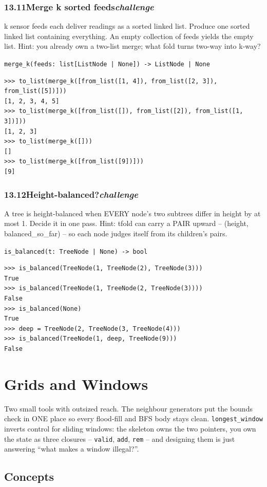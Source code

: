 \documentclass[10pt,letterpaper]{book}
\begin{document}
\subsection*{13.11\quad Merge k sorted feeds\hfill\textnormal{\textit{challenge}}}
k sensor feeds each deliver readings as a sorted linked list. Produce one sorted linked list containing everything. An empty collection of feeds yields the empty list. Hint: you already own a two-list merge; what fold turns two-way into k-way?

\noindent\texttt{merge\_k(feeds: list[ListNode | None]) -> ListNode | None}
\begin{lstlisting}[style=ex]
>>> to_list(merge_k([from_list([1, 4]), from_list([2, 3]), from_list([5])]))
[1, 2, 3, 4, 5]
>>> to_list(merge_k([from_list([]), from_list([2]), from_list([1, 3])]))
[1, 2, 3]
>>> to_list(merge_k([]))
[]
>>> to_list(merge_k([from_list([9])]))
[9]
\end{lstlisting}
\subsection*{13.12\quad Height-balanced?\hfill\textnormal{\textit{challenge}}}
A tree is height-balanced when EVERY node's two subtrees differ in height by at most 1. Decide it in one pass. Hint: tfold can carry a PAIR upward -- (height, balanced\_so\_far) -- so each node judges itself from its children's pairs.

\noindent\texttt{is\_balanced(t: TreeNode | None) -> bool}
\begin{lstlisting}[style=ex]
>>> is_balanced(TreeNode(1, TreeNode(2), TreeNode(3)))
True
>>> is_balanced(TreeNode(1, TreeNode(2, TreeNode(3))))
False
>>> is_balanced(None)
True
>>> deep = TreeNode(2, TreeNode(3, TreeNode(4)))
>>> is_balanced(TreeNode(1, deep, TreeNode(9)))
False
\end{lstlisting}
\clearpage
\chapter{Grids and Windows}

Two small tools with outsized reach. The neighbour generators put the
bounds check in ONE place so every flood-fill and BFS body stays clean.
\texttt{longest\_window} inverts control for sliding windows: the skeleton
owns the two pointers, you own the state as three closures --
\texttt{valid}, \texttt{add}, \texttt{rem} -- and designing them is just
answering ``what makes a window illegal?''.
\section{Concepts}
\end{document}
